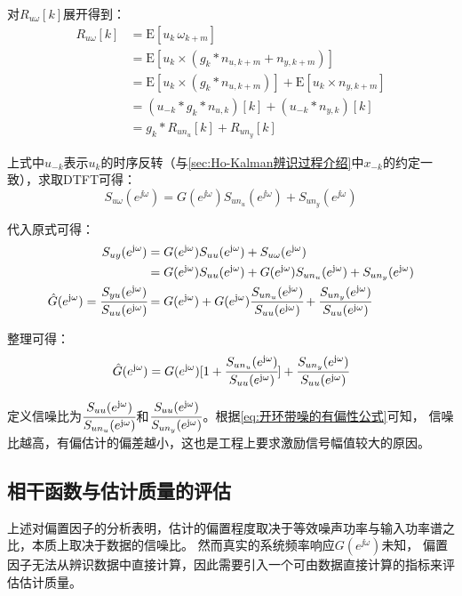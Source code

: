 对\(R_{u\omega}[k]\)展开得到：
\begin{align*}
    R_{u\omega}[k] &= \text{E}[u_k\,\omega_{k+m}]\\
    &= \text{E}[u_k\times(g_k*n_{u,k+m}+n_{y,k+m})]\\
    &= \text{E}[u_k\times(g_k*n_{u,k+m})]+\text{E}[u_k\times n_{y,k+m}]\\
    &= (u_{-k}*g_k*n_{u,k})[k]+(u_{-k}*n_{y,k})[k]\\
    &= g_k*R_{un_u}[k]+R_{un_y}[k]
\end{align*}

上式中\(u_{-k}\)表示\(u_k\)的时序反转（与\ref{sec:Ho-Kalman辨识过程介绍}中\(x_{-k}\)的约定一致），求取DTFT可得：
\begin{equation*}
    S_{u\omega}(e^{\jj\omega})=G(e^{\jj\omega})S_{un_u}(e^{\jj\omega})+S_{un_y}(e^{\jj\omega})
\end{equation*}

代入原式可得：
\begin{align*}
    S_{uy}(e^{\mathrm{j}\omega})&=G(e^{\mathrm{j}\omega})S_{uu}(e^{\mathrm{j}\omega})+S_{u\omega}(e^{\mathrm{j}\omega})\\
    &= G(e^{\mathrm{j}\omega})S_{uu}(e^{\mathrm{j}\omega})+G(e^{\mathrm{j}\omega})S_{un_u}(e^{\mathrm{j}\omega})+S_{un_y}(e^{\mathrm{j}\omega})\\
    \hat{G}(e^{\mathrm{j}\omega})=\cfrac{S_{yu}(e^{\mathrm{j}\omega})}{S_{uu}(e^{\mathrm{j}\omega})}&=G(e^{\mathrm{j}\omega})+G(e^{\mathrm{j}\omega})\cfrac{S_{un_u}(e^{\mathrm{j}\omega})}{S_{uu}(e^{\mathrm{j}\omega})}+\cfrac{S_{un_y}(e^{\mathrm{j}\omega})}{S_{uu}(e^{\mathrm{j}\omega})}
\end{align*}

整理可得：
\begin{equation}
    \hat{G}(e^{\mathrm{j}\omega})=G(e^{\mathrm{j}\omega})[1+\cfrac{S_{un_u}(e^{\mathrm{j}\omega})}{S_{uu}(e^{\mathrm{j}\omega})}]+\cfrac{S_{un_y}(e^{\mathrm{j}\omega})}{S_{uu}(e^{\mathrm{j}\omega})}
    \label{eq:开环带噪的有偏性公式}
\end{equation}

定义信噪比为\(\cfrac{S_{uu}(e^{\mathrm{j}\omega})}{S_{un_u}(e^{\mathrm{j}\omega})}\)和\(\cfrac{S_{uu}(e^{\mathrm{j}\omega})}{S_{un_y}(e^{\mathrm{j}\omega})}\)。根据\ref{eq:开环带噪的有偏性公式}可知，
信噪比越高，有偏估计的偏差越小，这也是工程上要求激励信号幅值较大的原因。

\subsection{相干函数与估计质量的评估\label{sec:相干函数与估计质量的评估}}

上述对偏置因子的分析表明，估计的偏置程度取决于等效噪声功率与输入功率谱之比，本质上取决于数据的信噪比。
然而真实的系统频率响应\(G(e^{\jj\omega})\)未知，
偏置因子无法从辨识数据中直接计算，因此需要引入一个可由数据直接计算的指标来评估估计质量。

